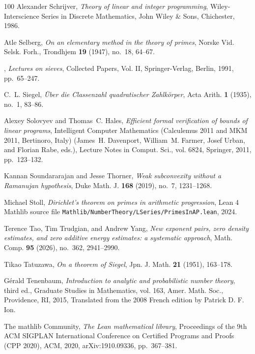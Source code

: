 \documentclass[11pt]{amsart}
\numberwithin{equation}{section}
\theoremstyle{plain}
\theoremstyle{definition}
\theoremstyle{remark}
\newcommand{\1}{\mathbf{1}}
\begin{document}
\begin{thebibliography}{100}
Alexander Schrijver, \emph{Theory of linear and integer programming},
  Wiley-Interscience Series in Discrete Mathematics, John Wiley \& Sons,
  Chichester, 1986.

Atle Selberg, \emph{On an elementary method in the theory of primes}, Norske
  Vid. Selsk. Forh., Trondhjem \textbf{19} (1947), no.~18, 64--67. 

\bysame, \emph{Lectures on sieves}, Collected Papers, Vol. II, Springer-Verlag,
  Berlin, 1991, pp.~65--247.

C.~L. Siegel, \emph{{\"U}ber die {C}lassenzahl quadratischer {Z}ahlk{\"o}rper},
  Acta Arith. \textbf{1} (1935), no.~1, 83--86.

Alexey Solovyev and Thomas~C. Hales, \emph{Efficient formal verification of
  bounds of linear programs}, Intelligent Computer Mathematics (Calculemus 2011
  and MKM 2011, Bertinoro, Italy) (James~H. Davenport, William~M. Farmer, Josef
  Urban, and Florian Rabe, eds.), Lecture Notes in Comput. Sci., vol. 6824,
  Springer, 2011, pp.~123--132.

Kannan Soundararajan and Jesse Thorner, \emph{Weak subconvexity without a
  {R}amanujan hypothesis}, Duke Math. J. \textbf{168} (2019), no.~7,
  1231--1268.

Michael Stoll, \emph{Dirichlet's theorem on primes in arithmetic progression},
  Lean 4 Mathlib source file
  \texttt{Mathlib/NumberTheory/LSeries/PrimesInAP.lean}, 2024.

Terence Tao, Tim Trudgian, and Andrew Yang, \emph{New exponent pairs, zero
  density estimates, and zero additive energy estimates: a systematic
  approach}, Math. Comp. \textbf{95} (2026), no.~362, 2941--2990.

Tikao Tatuzawa, \emph{On a theorem of {S}iegel}, Jpn. J. Math. \textbf{21}
  (1951), 163--178. 

G{\'e}rald Tenenbaum, \emph{Introduction to analytic and probabilistic number
  theory}, third ed., Graduate Studies in Mathematics, vol. 163, Amer. Math.
  Soc., Providence, RI, 2015, Translated from the 2008 French edition by
  Patrick D. F. Ion. 

{The mathlib Community}, \emph{The {L}ean mathematical library}, Proceedings of
  the 9th {ACM SIGPLAN} International Conference on Certified Programs and
  Proofs ({CPP} 2020), ACM, 2020, arXiv:1910.09336, pp.~367--381.


\end{thebibliography}
\end{document}
